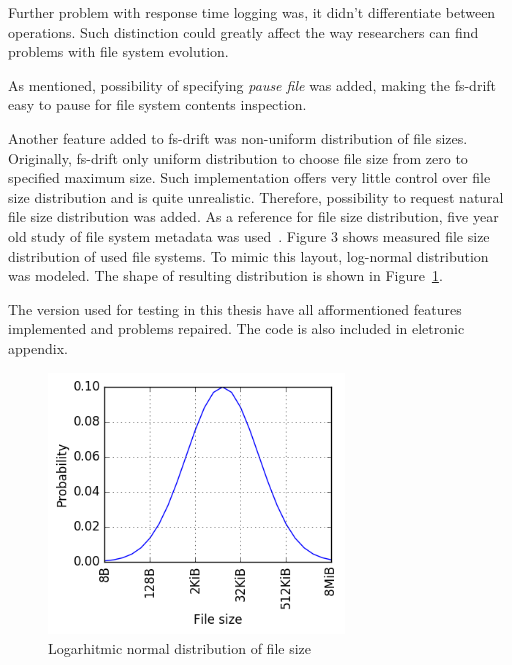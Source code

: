 \documentclass[
  color, %
  table, %
  lof,   %
  lot,   %
]{fithesis3}
\begin{document}
Further problem with response time logging was, it didn't differentiate between operations. Such distinction could greatly affect the way researchers can find problems with file system evolution.

As mentioned, possibility of specifying \textit{pause file} was added, making the fs-drift easy to pause for file system contents inspection.

Another feature added to fs-drift was non-uniform distribution of file sizes. Originally, fs-drift only uniform distribution to choose file size from zero to specified maximum size. Such implementation offers very little control over file size distribution and is quite unrealistic. Therefore, possibility to request natural file size distribution was added. As a reference for file size distribution, five year old study of file system metadata was used~\cite{agrawal2007five}. Figure 3 shows measured file size distribution of used file systems. To mimic this layout, log-normal distribution was modeled. The shape of resulting distribution is shown in Figure~\ref{fig:lognormal}.

The version used for testing in this thesis have all afformentioned features implemented and problems repaired. The code is also included in eletronic appendix.

\begin{figure}[!htb]
    \begin{minipage}{\textwidth}
        \centering
        \includegraphics[width=0.7\textwidth]{../scripts/dist3.png}
        \caption{Logarhitmic normal distribution of file size}
\label{fig:lognormal}
    \end{minipage}
\end{figure}
\end{document}
